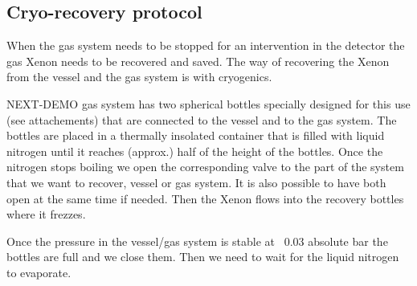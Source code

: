 \subsection{Cryo-recovery protocol}

When the gas system needs to be stopped for an intervention in the detector the gas Xenon needs to be recovered and saved. The way of recovering the Xenon from the vessel and the gas system is with cryogenics.

NEXT-DEMO gas system has two spherical bottles specially designed for this use (see attachements) that are connected to the vessel and to the gas system. The bottles are placed in a thermally insolated container that is filled with liquid nitrogen until it reaches (approx.) half of the height of the bottles. Once the nitrogen stops boiling we open the corresponding valve to the part of the system that we want to recover, vessel or gas system. It is also possible to have both open at the same time if needed. Then the Xenon flows into the recovery bottles where it frezzes.

Once the pressure in the vessel/gas system is stable at ~0.03 absolute bar the bottles are full and we close them. Then we need to wait for the liquid nitrogen to evaporate.